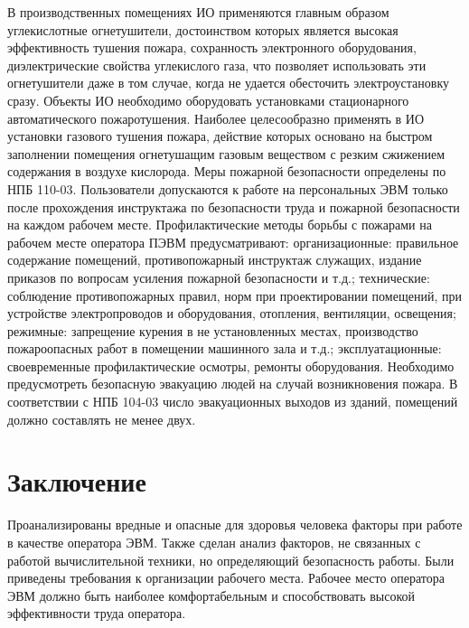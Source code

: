 \documentclass[utf8,usehyperref,12pt]{G7-32}
\begin{document}
В производственных помещениях ИО применяются главным образом углекислотные огнетушители, достоинством которых является высокая эффективность тушения пожара, сохранность электронного оборудования, диэлектрические свойства углекислого газа, что позволяет использовать эти огнетушители даже в том случае, когда не удается обесточить электроустановку сразу. 
Объекты ИО необходимо оборудовать установками стационарного автоматического пожаротушения. Наиболее целесообразно применять в ИО установки газового тушения пожара, действие которых основано на быстром заполнении помещения огнетушащим газовым веществом с резким сжижением содержания в воздухе кислорода.
Меры пожарной безопасности определены по НПБ 110-03. Пользователи допускаются к работе на персональных ЭВМ только после прохождения инструктажа по безопасности труда и пожарной безопасности на каждом рабочем месте.
Профилактические методы борьбы с пожарами на рабочем месте оператора ПЭВМ предусматривают:
организационные: правильное содержание помещений, противопожарный инструктаж служащих, издание приказов по вопросам усиления пожарной безопасности 
и т.д.;
технические: соблюдение противопожарных правил, норм при проектировании помещений, при устройстве электропроводов и оборудования, отопления, вентиляции, освещения;
режимные: запрещение курения в не установленных местах, производство пожароопасных работ в помещении машинного зала и т.д.;
эксплуатационные: своевременные профилактические осмотры, ремонты оборудования.
Необходимо предусмотреть безопасную эвакуацию людей на случай возникновения пожара. В соответствии с НПБ 104-03 число эвакуационных выходов из зданий, помещений должно составлять не менее двух.

\section{Заключение}
Проанализированы вредные и опасные для здоровья человека факторы при работе в качестве оператора ЭВМ. Также сделан анализ факторов, не связанных с работой вычислительной техники, но определяющий безопасность работы. Были приведены требования к организации рабочего места. Рабочее место оператора ЭВМ должно быть наиболее комфортабельным и способствовать высокой эффективности труда оператора.
\end{document}
